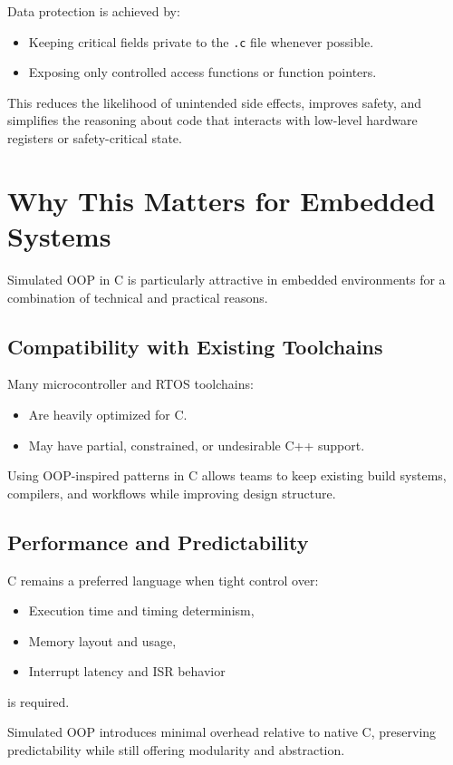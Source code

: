 \documentclass[11pt]{article}
\begin{document}
Data protection is achieved by:
\begin{itemize}[nosep]
  \item Keeping critical fields private to the \texttt{.c} file whenever possible.
  \item Exposing only controlled access functions or function pointers.
\end{itemize}

This reduces the likelihood of unintended side effects, improves safety, and simplifies the reasoning about code that interacts with low-level hardware registers or safety-critical state.

\section{Why This Matters for Embedded Systems}

Simulated OOP in C is particularly attractive in embedded environments for a combination of technical and practical reasons.

\subsection{Compatibility with Existing Toolchains}

Many microcontroller and RTOS toolchains:
\begin{itemize}[nosep]
  \item Are heavily optimized for C.
  \item May have partial, constrained, or undesirable C++ support.
\end{itemize}

Using OOP-inspired patterns in C allows teams to keep existing build systems, compilers, and workflows while improving design structure.

\subsection{Performance and Predictability}

C remains a preferred language when tight control over:
\begin{itemize}[nosep]
  \item Execution time and timing determinism,
  \item Memory layout and usage,
  \item Interrupt latency and ISR behavior
\end{itemize}
is required.

Simulated OOP introduces minimal overhead relative to native C, preserving predictability while still offering modularity and abstraction.
\end{document}
